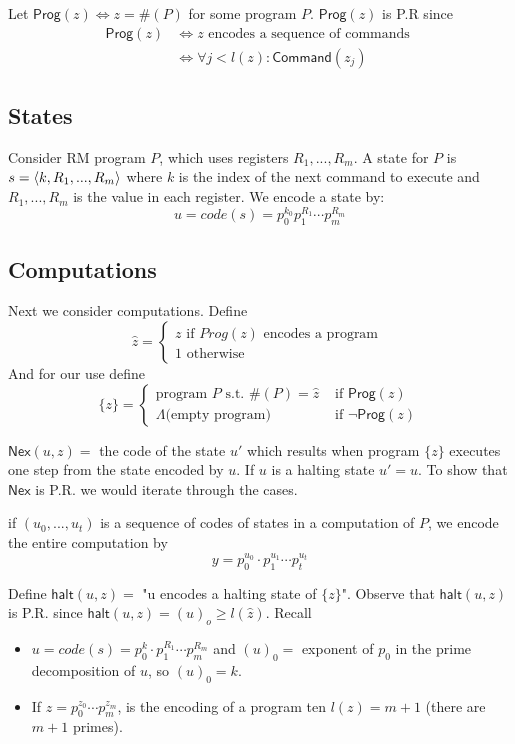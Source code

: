 \documentclass[twoside]{article}
\def\Nex{\mathsf{Nex}}
\def\Command{\mathsf{Command}}
\def\Prog{\mathsf{Prog}}
\def\halt{\mathsf{halt}}
\DeclarePairedDelimiter\anglebrac{\langle}{\rangle}
\begin{document}
Let $\Prog (z) \iff z = \# (P)$ for some program $P$. $\Prog (z)$ is P.R since 
\begin{align*}
\Prog (z) &\iff z \mbox{ encodes a sequence of commands }\\
&\iff \forall j < l(z): \Command (z_j)
\end{align*}

\subsection{States}
Consider RM program $P$, which uses registers $R_1, ..., R_m$. A state for $P$ is $s = \anglebrac{k, R_1, ..., R_m}$ where $k$ is the index of the next command to execute and $R_1, ..., R_m$ is the value in each register. We encode a state by:
\[u = code(s) = p_0^{k_0}p_1^{R_1} \cdots p_m^{R_m}\]

\subsection{Computations}
Next we consider computations. Define
\[\hat{z} = \begin{cases}
z \mbox{ if $Prog(z)$ encodes a program } \\
1 \mbox{ otherwise }
\end{cases}\]
And for our use define
\[\{z\} = \begin{cases}
\mbox{program $P$ s.t. } \# (P) = \hat{z} &\mbox{ if } \Prog(z) \\
\Lambda \mbox{(empty program)} &\mbox{ if } \lnot \Prog(z)
\end{cases}\]

$\Nex(u,z) = $ the code of the state $u'$ which results when program $\{z\}$ executes one step from the state encoded by $u$. If $u$ is a halting state $u' = u$. To show that $\Nex$ is P.R. we would iterate through the cases.

if $(u_0, ..., u_t)$ is a sequence of codes of states in a computation of $P$, we encode the entire computation by 
\[y = p_0^{u_0}\cdot p_1^{u_1} \cdots p_t^{u_t}\]

Define $\halt (u,z) = $ "u encodes a halting state of $\{z\}$". Observe that $\halt (u,z)$ is P.R. since $\halt(u,z) = (u)_o \geq l(\hat{z})$. Recall
\begin{itemize}
\item $u = code(s) = p_0^{k}\cdot p_1^{R_1} \cdots p_m^{R_m}$ and $(u)_0 =$ exponent of $p_0$ in the prime decomposition of $u$, so $(u)_0 = k$.
\item If $z = p_0^{z_0}\cdots p_m^{z_m}$, is the encoding of a program ten $l(z) = m+1$ (there are $m+1$ primes).
\end{itemize}
\end{document}

